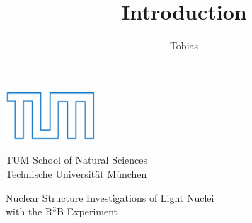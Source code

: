 \documentclass[12pt,twoside]{article}
\title{Introduction}
\author{Tobias}
\begin{document}
  \begin{titlepage}
\thispagestyle{empty}

\begin{center}
  \includegraphics[width=0.25\textwidth]{Figures/TUMLogo_oZ_Outline_blau_CMYK-eps-converted-to.pdf}
  
  \vspace{1em}
  \Large TUM School of Natural Sciences\\
  \vspace{1em}
  \large Technische Universit\"at M\"unchen\\
   \vspace{0.5em}
  \vspace{0.5em}
  
\end{center}

{%
  \centering %
  \vspace*{\baselineskip} %
  
  
	{\Large Nuclear Structure Investigations of Light Nuclei \\[0.3\baselineskip] with the R$^3$B Experiment   \\[0.3\baselineskip]
	}

  
}
\end{titlepage}
\end{document}
